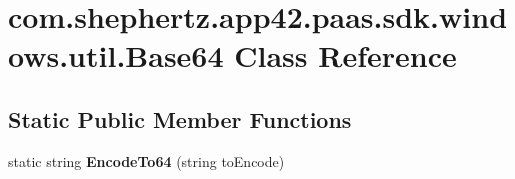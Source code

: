 \hypertarget{classcom_1_1shephertz_1_1app42_1_1paas_1_1sdk_1_1windows_1_1util_1_1_base64}{\section{com.\+shephertz.\+app42.\+paas.\+sdk.\+windows.\+util.\+Base64 Class Reference}
\label{classcom_1_1shephertz_1_1app42_1_1paas_1_1sdk_1_1windows_1_1util_1_1_base64}
}
\subsection*{Static Public Member Functions}
\begin{DoxyCompactItemize}
\item 
\hypertarget{classcom_1_1shephertz_1_1app42_1_1paas_1_1sdk_1_1windows_1_1util_1_1_base64_a42a6c5e655fa6b04bd3f9643ff229edd}{static string {\bfseries Encode\+To64} (string to\+Encode)}\label{classcom_1_1shephertz_1_1app42_1_1paas_1_1sdk_1_1windows_1_1util_1_1_base64_a42a6c5e655fa6b04bd3f9643ff229edd}

\end{DoxyCompactItemize}
